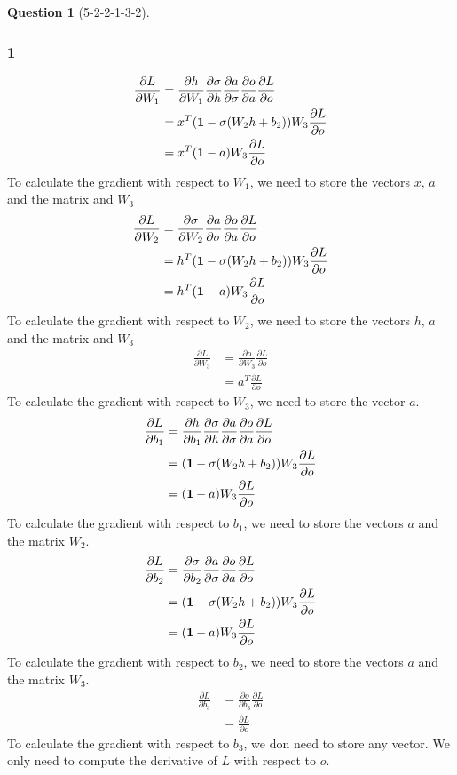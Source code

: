 \documentclass[12pt]{article}
\theoremstyle{definition}
\newtheorem{exercise}{Question}%
\newcommand{\pder}[2]{\frac{\partial #1}{\partial #2}}
\begin{document}
\begin{exercise}[5-2-2-1-3-2]
{\subsubsection*{1}
  \begin{align*}
    \pder{L}{W_1} &=    \pder{h}{W_{1}}\pder{\sigma}{h}\pder{a}{\sigma} \pder{o}{a} \pder{L}{o}\\
    &= x^{T}(\bold{1}-\sigma(W_{2}h+b_{2})) W_{3} \pder{L}{o}\\
    &= x^{T}(\bold{1}-a) W_{3} \pder{L}{o}
  \end{align*}
  To calculate the gradient with respect to $W_{1}$, we need to store the
  vectors $x,\, a $ and the matrix and $W_{3}$
  \begin{align*}
    \pder{L}{W_2} &= \pder{\sigma}{W_{2}} \pder{a}{\sigma} \pder{o}{a} \pder{L}{o}\\
    &=  h^{T}(\bold{1}-\sigma(W_{2}h+b_{2})) W_{3} \pder{L}{o}\\
    &=  h^{T}(\bold{1}-a) W_{3} \pder{L}{o}
  \end{align*}
  To calculate the gradient with respect to $W_{2}$, we need to store the
  vectors $ h,\, a $ and the matrix and $W_{3}$
  \begin{align*}
    \pder{L}{W_3} &= \pder{o}{W_{3}} \pder{L}{o}\\
    &= a^{T} \pder{L}{o}
  \end{align*}
  To calculate the gradient with respect to $W_{3}$, we need to store the
  vector $a$.
  \begin{align*}
    \pder{L}{b_{1}} &=   \pder{h}{b_{1}}\pder{\sigma}{h}\pder{a}{\sigma} \pder{o}{a} \pder{L}{o}\\
    &= (\bold{1}-\sigma(W_{2}h+b_{2})) W_{3} \pder{L}{o}\\
    &= (\bold{1}-a) W_{3} \pder{L}{o}
  \end{align*}
  To calculate the gradient with respect to $b_{1}$, we need to store the
  vectors $ a $ and the matrix $W_{2}$.
  \begin{align*}
    \pder{L}{b_{2}} &=\pder{\sigma}{b_{2}} \pder{a}{\sigma} \pder{o}{a} \pder{L}{o}\\
    &=  (\bold{1}-\sigma(W_{2}h+b_{2})) W_{3} \pder{L}{o}\\
    &=  (\bold{1}-a) W_{3} \pder{L}{o}
  \end{align*}
  To calculate the gradient with respect to $b_{2}$, we need to store the
  vectors $ a $ and the matrix $W_{3}$.
  \begin{align*}
    \pder{L}{b_{3}} &= \pder{o}{b_{3}} \pder{L}{o}\\
    &= \pder{L}{o}
  \end{align*}
  To calculate the gradient with respect to $b_{3}$, we don need to store any
  vector. We only need to compute the derivative of $L$ with respect to $o$.
}
\end{exercise}
\end{document}
